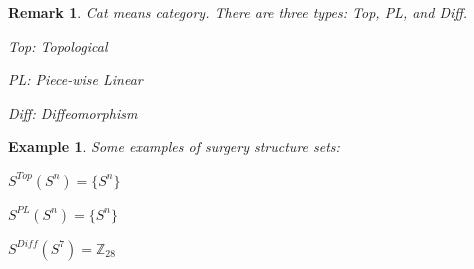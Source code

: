 \documentclass[oneside]{book}
\theoremstyle{mystyle}
\newtheorem{example}{Example}[section]
\newtheorem{remark}{Remark}[section]
\begin{document}
\begin{remark}
Cat means category. There are three types: Top, PL, and Diff. 
    \begin{itemize}
        \begin{multicols}{3}
            \item Top: Topological
            \item PL: Piece-wise Linear
            \item Diff: Diffeomorphism
        \end{multicols}
    \end{itemize}
\end{remark}
\begin{example}
Some examples of surgery structure sets:
    \begin{enumerate}
        \begin{multicols}{3}
            \item $S^{Top}(S^{n})=\{S^{n}\}$
            \item $S^{PL}(S^{n}) = \{S^{n}\}$
            \item $S^{Diff}(S^{7}) = \mathbb{Z}_{28}$
        \end{multicols}
    \end{enumerate}
\end{example}
\end{document}
